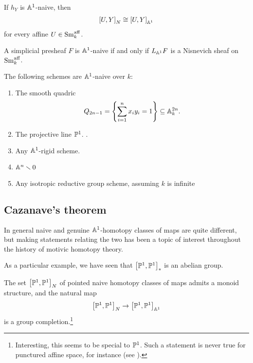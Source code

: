 \documentclass[11pt,openany]{book}
\providecommand{\aff}{\mathrm{aff}}
\begin{document}
\begin{proposition} If $h_Y$ is $\A^1$-naive, then
\begin{align*}
    \left[ U,Y \right]_N \cong \left[ U,Y \right]_{\A^1}
\end{align*}
for every affine $U \in \Sm_k^\aff$.
\end{proposition}




\begin{proposition} \cite[2.1.3]{AHW2}
A simplicial presheaf $F$ is $\A^1$-naive if and only if $L_{\A^1} F$ is a Nisnevich sheaf on $\Sm_k^\aff$.
\end{proposition}

\begin{example} The following schemes are $\A^1$-naive over $k$:
\begin{enumerate}
    \item The smooth quadric \cite[4.2.1]{AHW2}
    \begin{align*}
        Q_{2n-1} = \left\{ \sum_{i=1}^n x_i y_i =1 \right\} \subseteq \A_k^{2n}.
    \end{align*}
    
    \item The projective line $\P^1$. \cite[127]{BHQW}.

    \item Any $\A^1$-rigid scheme.

    \item $\A^n \minus 0$ \cite[4.2.6]{AHW2}

    \item Any isotropic reductive group scheme, assuming $k$ is infinite \cite[4.3.1]{AHW2}
\end{enumerate}
\end{example}



\subsection{Cazanave's theorem}

In general naive and genuine $\A^1$-homotopy classes of maps are quite different, but making statements relating the two has been a topic of interest throughout the history of motivic homotopy theory.

As a particular example, we have seen that $\left[ \P^1,\P^1 \right]_\ast$ is an abelian group. 

\begin{theorem} The set $\left[ \P^1,\P^1 \right]_N$ of pointed naive homotopy classes of maps admits a monoid structure, and the natural map
\begin{align*}
    \left[ \P^1,\P^1 \right]_N \to \left[ \P^1,\P^1 \right]_{\A^1}
\end{align*}
is a group completion.\footnote{Interesting, this seems to be special to $\P^1$. Such a statement is never true for punctured affine space, for instance (see \cite{brazeltonConcerningMonoidStructures2025}).}
\end{theorem}
\end{document}
